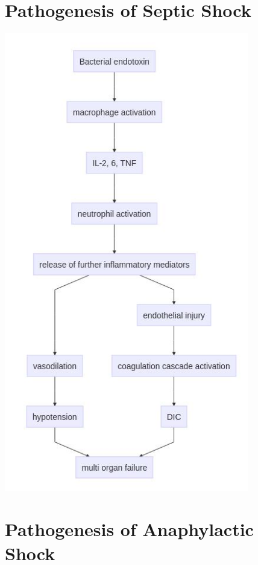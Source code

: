 \documentclass[
  14pt,
]{memoir}
\begin{document}
\hypertarget{pathogenesis-of-septic-shock}{%
\section{Pathogenesis of Septic
Shock}\label{pathogenesis-of-septic-shock}}

\includegraphics[width=0.8\textwidth]{septicshock.jpg} \pagebreak

\hypertarget{pathogenesis-of-anaphylactic-shock}{%
\section{Pathogenesis of Anaphylactic
Shock}\label{pathogenesis-of-anaphylactic-shock}}
\end{document}
